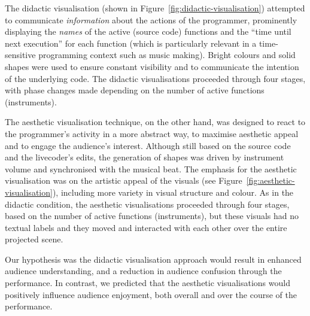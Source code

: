 The didactic visualisation (shown in
Figure~\ref{fig:didactic-visualisation}) attempted to communicate
\emph{information} about the actions of the programmer, prominently
displaying the \emph{names} of the active (source code) functions and
the ``time until next execution'' for each function (which is
particularly relevant in a time-sensitive programming context such as
music making). Bright colours and solid shapes were used to ensure
constant visibility and to communicate the intention of the underlying
code. The didactic visualisations proceeded through four stages, with
phase changes made depending on the number of active functions
(instruments).

The aesthetic visualisation technique, on the other hand, was designed
to react to the programmer's activity in a more abstract way, to
maximise aesthetic appeal~\cite{Cawthon2007} and to engage the
audience's interest. Although still based on the source code and the
livecoder's edits, the generation of shapes was driven by instrument
volume and synchronised with the musical beat. The emphasis for the
aesthetic visualisation was on the artistic appeal of the visuals (see
Figure~\ref{fig:aesthetic-visualisation}), including more variety in
visual structure and colour. As in the didactic condition, the
aesthetic visualisations proceeded through four stages, based on the
number of active functions (instruments), but these visuals had no
textual labels and they moved and interacted with each other over the
entire projected scene.

Our hypothesis was the didactic visualisation approach would result in
enhanced audience understanding, and a reduction in audience confusion
through the performance. In contrast, we predicted that the aesthetic
visualisations would positively influence audience enjoyment, both
overall and over the course of the performance.





